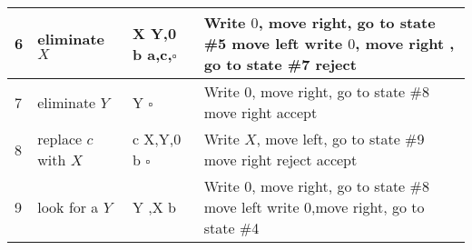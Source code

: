 \documentclass[10pt,letterpaper]{article}
\begin{document}
\begin{center}
\begin{tabular}{ | p{1.5cm} | p{3.5cm} | p{2cm} | p{8cm} | }
		6 & eliminate $X$ & X \newline Y,0 \newline b \newline a,c,$\square$ & Write $0$, move
			right, go to state \#5 \newline move left \newline write $0$, move right
			, go to state \#7 \newline reject \\ \hline

		7 & eliminate $Y$ & Y \newline 0 \newline $\square$ 
			& Write $0$, move right,
			go to state \#8 \newline move right \newline accept \\ \hline

		8 & replace $c$ with $X$ & c \newline X,Y,0 \newline b \newline $\square$ 
			& Write $X$, move left,	go to state \#9 \newline move right \newline
			reject  \newline accept \\ \hline

		9 & look for a $Y$ & Y \newline 0,X \newline b & Write $0$, move right,
			go to state \#8 \newline move left \newline write $0$,move right,
			go to state \#4 \\ \hline


\end{tabular}
\end{center}
\end{document}
